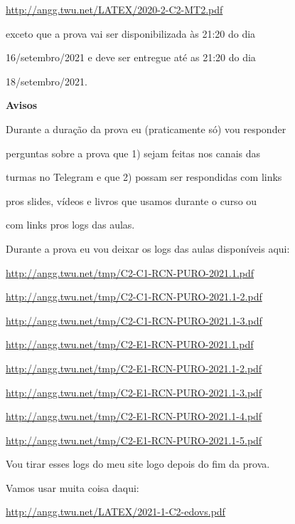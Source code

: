 \documentclass[oneside,12pt]{article}
\begin{document}
\url{http://angg.twu.net/LATEX/2020-2-C2-MT2.pdf}

\ssk

exceto que a prova vai ser disponibilizada às 21:20 do dia

16/setembro/2021 e deve ser entregue até as 21:20 do dia

18/setembro/2021.

\newpage

{\bf Avisos}

Durante a duração da prova eu (praticamente só) vou responder

perguntas sobre a prova que 1) sejam feitas nos canais das

turmas no Telegram e que 2) possam ser respondidas com links

pros slides, vídeos e livros que usamos durante o curso ou

com links pros logs das aulas.

\msk

Durante a prova eu vou deixar os logs das aulas disponíveis aqui:

\msk

{\scriptsize

\url{http://angg.twu.net/tmp/C2-C1-RCN-PURO-2021.1.pdf}

\url{http://angg.twu.net/tmp/C2-C1-RCN-PURO-2021.1-2.pdf}

\url{http://angg.twu.net/tmp/C2-C1-RCN-PURO-2021.1-3.pdf}

\msk

\url{http://angg.twu.net/tmp/C2-E1-RCN-PURO-2021.1.pdf}

\url{http://angg.twu.net/tmp/C2-E1-RCN-PURO-2021.1-2.pdf}

\url{http://angg.twu.net/tmp/C2-E1-RCN-PURO-2021.1-3.pdf}

\url{http://angg.twu.net/tmp/C2-E1-RCN-PURO-2021.1-4.pdf}

\url{http://angg.twu.net/tmp/C2-E1-RCN-PURO-2021.1-5.pdf}

}

Vou tirar esses logs do meu site logo depois do fim da prova.


\newpage


Vamos usar muita coisa daqui:

{\footnotesize

\url{http://angg.twu.net/LATEX/2021-1-C2-edovs.pdf}

}
\end{document}
